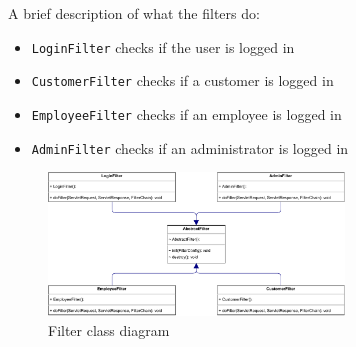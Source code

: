 A brief description of what the filters do:
\begin{itemize}
    \item \texttt{LoginFilter} checks if the user is logged in
    \item \texttt{CustomerFilter} checks if a customer is logged in
    \item \texttt{EmployeeFilter} checks if an employee is logged in
    \item \texttt{AdminFilter} checks if an administrator is logged in
\end{itemize}
\FloatBarrier

\begin{figure}[H]
    \centering
    \includegraphics[width=0.7\textwidth]{Schemas/filter.drawio.pdf}
    \caption{Filter class diagram}
    \label{fig:FilterClassDiagram}
\end{figure}